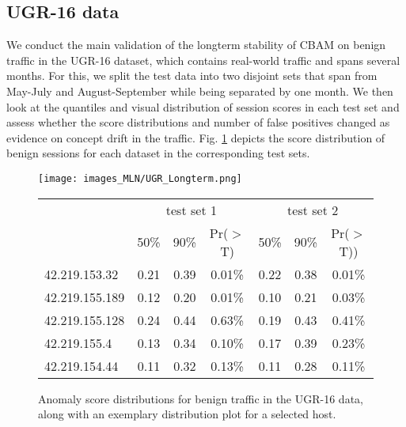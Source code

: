 \subsection{UGR-16 data}\label{sec:UGR_benign}


We conduct the main validation of the longterm stability of CBAM on benign traffic in the UGR-16 dataset, which contains real-world traffic and spans several months. For this, we split the test data into two disjoint sets that span from May-July and August-September while being separated by one month.
We then look at the quantiles and visual distribution of session scores in each test set and assess whether the score distributions and number of false positives changed as evidence on concept drift in the traffic.
Fig. \ref{fig:UGRrealresults} depicts the score distribution of benign sessions for each dataset in the corresponding test sets. 




\begin{figure}
    \begin{center}
\texttt{[image: images\_MLN/UGR\_Longterm.png]} 


\begin{tabular}{l|ccc|ccc}
  \hline
&\multicolumn{3}{c|}{test set 1}&\multicolumn{3}{c}{test set 2}\\
 &  50\%  &  90\%  &  Pr($>$T)  &  50\%  &  90\%  &  Pr($>$T)) \\ 
  \hline
42.219.153.32 & 0.21 & 0.39   & 0.01\% & 0.22 & 0.38   & 0.01\% \\ 
  42.219.155.189 & 0.12 & 0.20  & 0.01\% &0.10 & 0.21  & 0.03\% \\ 
  42.219.155.128 & 0.24 & 0.44   & 0.63\% & 0.19 & 0.43   & 0.41\% \\ 
  42.219.155.4 & 0.13 & 0.34 & 0.10\% & 0.17 & 0.39 & 0.23\% \\ 
  42.219.154.44 & 0.11 & 0.32 & 0.13\% & 0.11 & 0.28 & 0.11\% \\ 
   \hline
\end{tabular}


\end{center}
\caption{Anomaly score distributions for benign traffic in the UGR-16 data, along with an exemplary distribution plot for a selected host.}\label{fig:UGRrealresults}
\end{figure}




